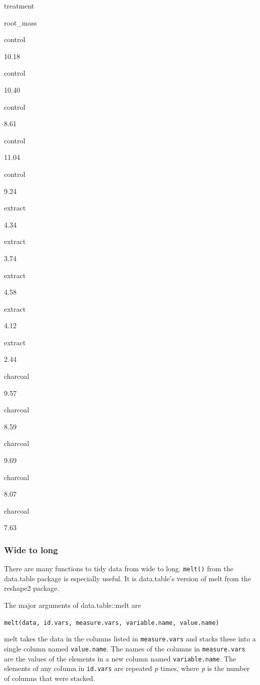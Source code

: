 \documentclass[]{book}
\begin{document}
treatment

root\_mass

control

10.18

control

10.40

control

8.61

control

11.04

control

9.24

extract

4.34

extract

3.74

extract

4.58

extract

4.12

extract

2.44

charcoal

9.57

charcoal

8.59

charcoal

9.69

charcoal

8.07

charcoal

7.63

\subsubsection{Wide to long}\label{wide-to-long}

There are many functions to tidy data from wide to long. \texttt{melt()}
from the data.table package is especially useful. It is data.table's
version of melt from the reshape2 package.

The major arguments of data.table::melt are

\texttt{melt(data,\ id.vars,\ measure.vars,\ variable.name,\ value.name)}

melt takes the data in the columns listed in \texttt{measure.vars} and
stacks these into a single column named \texttt{value.name}. The names
of the columns in \texttt{measure.vars} are the values of the elements
in a new column named \texttt{variable.name}. The elements of any column
in \texttt{id.vars} are repeated \emph{p} times, where \emph{p} is the
number of columns that were stacked.
\end{document}
